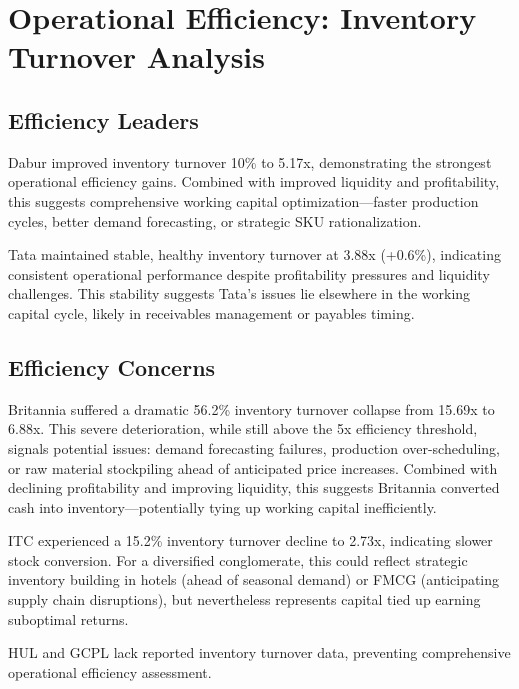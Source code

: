\documentclass[12pt, a4paper]{report}
\begin{document}
\vspace{0.3cm}

\section{Operational Efficiency: Inventory Turnover Analysis}

\subsection{Efficiency Leaders}

Dabur improved inventory turnover 10\% to 5.17x, demonstrating the strongest operational efficiency gains. Combined with improved liquidity and profitability, this suggests comprehensive working capital optimization—faster production cycles, better demand forecasting, or strategic SKU rationalization.

Tata maintained stable, healthy inventory turnover at 3.88x (+0.6\%), indicating consistent operational performance despite profitability pressures and liquidity challenges. This stability suggests Tata's issues lie elsewhere in the working capital cycle, likely in receivables management or payables timing.

\subsection{Efficiency Concerns}

Britannia suffered a dramatic 56.2\% inventory turnover collapse from 15.69x to 6.88x. This severe deterioration, while still above the 5x efficiency threshold, signals potential issues: demand forecasting failures, production over-scheduling, or raw material stockpiling ahead of anticipated price increases. Combined with declining profitability and improving liquidity, this suggests Britannia converted cash into inventory—potentially tying up working capital inefficiently.

ITC experienced a 15.2\% inventory turnover decline to 2.73x, indicating slower stock conversion. For a diversified conglomerate, this could reflect strategic inventory building in hotels (ahead of seasonal demand) or FMCG (anticipating supply chain disruptions), but nevertheless represents capital tied up earning suboptimal returns.

HUL and GCPL lack reported inventory turnover data, preventing comprehensive operational efficiency assessment.
\end{document}
